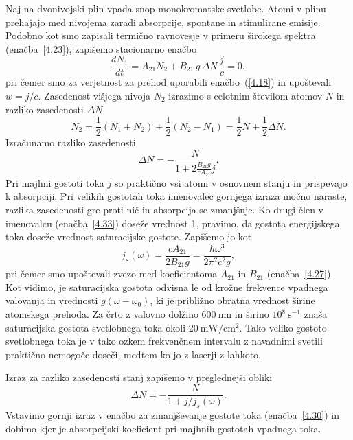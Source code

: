 Naj na dvonivojski plin vpada snop monokromatske svetlobe. 
Atomi v plinu prehajajo med nivojema zaradi absorpcije, spontane in stimulirane emisije. 
Podobno kot smo zapisali termično ravnovesje v primeru
širokega spektra (enačba~\ref{4.23}), zapišemo stacionarno enačbo 
\begin{equation}
\frac{dN_{1}}{dt}=A_{21}N_{2}+B_{21}\,g\,\Delta N\,\frac{j}{c}=0,
\label{4.32}
\end{equation}
pri čemer smo za verjetnost za prehod uporabili
enačbo~(\ref{4.18}) in upoštevali $w=j/c$. Zasedenost višjega nivoja $N_{2}$ izrazimo s 
celotnim številom atomov $N$ in razliko zasedenosti $\Delta N$
\begin{equation}
N_{2}=\frac{1}{2}(N_1+N_2) + \frac{1}{2}(N_2-N_1) = \frac{1}{2}N+\frac{1}{2}\Delta N.
\label{4.321}
\end{equation}
Izračunamo razliko zasedenosti 
\begin{equation}
\Delta N=-\frac{N}{1+2\frac{B_{21}g}{cA_{21}}j}.
\label{4.33}
\end{equation}
Pri majhni gostoti toka $j$ so praktično vsi atomi v osnovnem stanju in prispevajo
k absorpciji. Pri velikih gostotah toka  imenovalec gornjega
izraza močno naraste, razlika zasedenosti gre proti nič in absorpcija se zmanjšuje.
Ko drugi člen v imenovalcu (enačba~\ref{4.33}) doseže vrednost 1, pravimo, da
gostota energijskega toka doseže vrednost saturacijske gostote.
Zapišemo jo kot 
\begin{equation}
j_{s}(\omega)=\frac{cA_{21}}{2B_{21}g}=
\frac{\hbar\omega^{3}}{2\pi^{2}c^{2}g},
\label{4.34}
\end{equation}
pri čemer smo upoštevali zvezo med koeficientoma $A_{21}$ in $B_{21}$
(enačba~\ref{4.27}).
Kot vidimo, je saturacijska gostota odvisna le od krožne frekvence vpadnega valovanja 
in vrednosti $g(\omega - \omega_0)$, ki je približno obratna vrednost širine atomskega 
prehoda. Za črto z valovno dolžino $600~\si{\nano\metre}$ 
in širino $10^{8}~\si{\second}^{-1}$ znaša saturacijska gostota svetlobnega toka okoli 
$20~\si{\milli\watt/\centi\metre^2}$. Tako veliko gostoto svetlobnega toka je v tako ozkem
frekvenčnem intervalu z navadnimi svetili praktično nemogoče doseči, 
medtem ko jo z laserji z lahkoto.

Izraz za razliko zasedenosti stanj zapišemo v preglednejši obliki
\begin{equation}
\Delta N=-\frac{N}{1+j/j_{s}(\omega)}.
\label{4.35}
\end{equation}
Vstavimo gornji izraz v enačbo za zmanjševanje gostote toka (enačba~\ref{4.30}) in dobimo
kjer je 
absorpcijski koeficient pri majhnih gostotah vpadnega toka.

